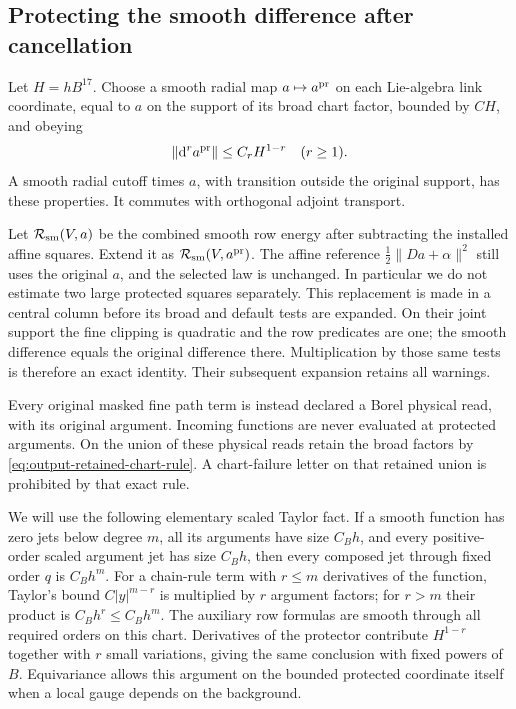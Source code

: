 \documentclass[11pt,reqno]{amsart}
\numberwithin{equation}{section}
\theoremstyle{definition}
\theoremstyle{remark}
\newcommand{\dd}{\mathrm d}
\begin{document}
\subsection{Protecting the smooth difference after cancellation}

Let \(H=hB^{17}\). Choose a smooth radial map
\(a\mapsto a^{\rm pr}\) on each Lie-algebra link coordinate,
equal to \(a\) on the support of its broad chart factor,
bounded by \(CH\), and obeying
\begin{equation}
           \|\dd^r a^{\rm pr}\|\le C_rH^{1-r}\quad(r\ge1).
 \label{eq:central-protector-jets}
\end{equation}
A smooth radial cutoff times \(a\), with transition outside
the original support, has these properties. It commutes with
orthogonal adjoint transport.

Let \(\mathcal R_{\rm sm}(V,a)\) be the combined smooth row
energy after subtracting the installed affine squares. Extend
it as \(\mathcal R_{\rm sm}(V,a^{\rm pr})\). The affine
reference \(\frac12\|Da+\alpha\|^2\) still uses the original
\(a\), and the selected law is unchanged. In particular we
do not estimate two large protected squares separately.
This replacement is made in a central column before its broad
and default tests are expanded. On their joint support the
fine clipping is quadratic and the row predicates are one;
the smooth difference equals the original difference there.
Multiplication by those same tests is therefore an exact
identity. Their subsequent expansion retains all warnings.

Every original masked fine path term is instead declared a
Borel physical read, with its original argument. Incoming
functions are never evaluated at protected arguments. On the
union of these physical reads retain the broad factors by
\eqref{eq:output-retained-chart-rule}. A chart-failure letter
on that retained union is prohibited by that exact rule.

We will use the following elementary scaled Taylor fact.
If a smooth function has zero jets below degree \(m\), all
its arguments have size \(C_Bh\), and every positive-order
scaled argument jet has size \(C_Bh\), then every composed
jet through fixed order \(q\) is \(C_Bh^m\). For a chain-rule
term with \(r\le m\) derivatives of the function, Taylor's
bound \(C|y|^{m-r}\) is multiplied by \(r\) argument factors;
for \(r>m\) their product is \(C_Bh^r\le C_Bh^m\).
The auxiliary row formulas are smooth through all required
orders on this chart. Derivatives of the protector contribute
\(H^{1-r}\) together with \(r\) small variations, giving
the same conclusion with fixed powers of \(B\). Equivariance
allows this argument on the bounded protected coordinate
itself when a local gauge depends on the background.
\end{document}
